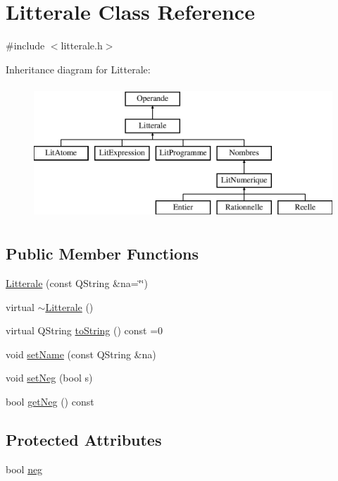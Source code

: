 \hypertarget{class_litterale}{}\section{Litterale Class Reference}
\label{class_litterale}


{\ttfamily \#include $<$litterale.\+h$>$}

Inheritance diagram for Litterale\+:\begin{figure}[H]
\begin{center}
\leavevmode
\includegraphics[height=5.000000cm]{class_litterale}
\end{center}
\end{figure}
\subsection*{Public Member Functions}
\begin{DoxyCompactItemize}
\item 
\hyperlink{class_litterale_acb86136fe5bd79b5711c4e64cc1e6284}{Litterale} (const Q\+String \&na=\char`\"{}\char`\"{})
\item 
virtual \hyperlink{class_litterale_af4260da555bb5fe3a24b7f3ad8562ba0}{$\sim$\+Litterale} ()
\item 
virtual Q\+String \hyperlink{class_litterale_a3b427621132af2903259390143d1b16d}{to\+String} () const  =0
\item 
void \hyperlink{class_litterale_a443b6ad424c61d9ce15f9471fcb78c62}{set\+Name} (const Q\+String \&na)
\item 
void \hyperlink{class_litterale_a357f16f4a8c5ed2e06a2441d0a33a27f}{set\+Neg} (bool s)
\item 
bool \hyperlink{class_litterale_a23b71dce3c0635be4e361a950d367329}{get\+Neg} () const 
\end{DoxyCompactItemize}
\subsection*{Protected Attributes}
\begin{DoxyCompactItemize}
\item 
bool \hyperlink{class_litterale_a2477aeadea6c34dce5614e5e8aa701f2}{neg}
\end{DoxyCompactItemize}
